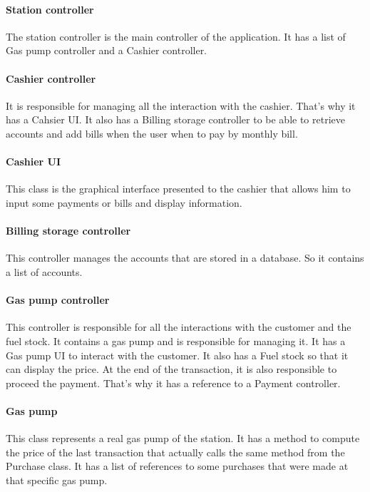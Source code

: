 \paragraph{Station controller}
The station controller is the main controller of the application. It has a list of Gas pump controller and a Cashier controller. 

\paragraph{Cashier controller}
It is responsible for managing all the interaction with the cashier. That's why it has a Cahsier UI. It also has a Billing storage controller to be able to retrieve accounts and add bills when the user when to pay by monthly bill.

\paragraph{Cashier UI}
This class is the graphical interface presented to the cashier that allows him to input some payments or bills and display information.

\paragraph{Billing storage controller}
This controller manages the accounts that are stored in a database. So it contains a list of accounts.

\paragraph{Gas pump controller}
This controller is responsible for all the interactions with the customer and the fuel stock.
It contains a gas pump and is responsible for managing it. It has a Gas pump UI to interact with the customer. It also has a Fuel stock so that it can display the price.
At the end of the transaction, it is also responsible to proceed the payment. That's why it has a reference to a Payment controller.

\paragraph{Gas pump}
This class represents a real gas pump of the station. It has a method to compute the price of the last transaction that actually calls the same method from the Purchase class.
It has a list of references to some purchases that were made at that specific gas pump.

